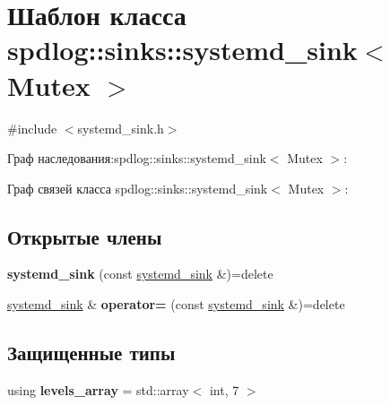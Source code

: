 \hypertarget{classspdlog_1_1sinks_1_1systemd__sink}{}\section{Шаблон класса spdlog\+:\+:sinks\+:\+:systemd\+\_\+sink$<$ Mutex $>$}
\label{classspdlog_1_1sinks_1_1systemd__sink}


{\ttfamily \#include $<$systemd\+\_\+sink.\+h$>$}



Граф наследования\+:spdlog\+:\+:sinks\+:\+:systemd\+\_\+sink$<$ Mutex $>$\+:


Граф связей класса spdlog\+:\+:sinks\+:\+:systemd\+\_\+sink$<$ Mutex $>$\+:
\subsection*{Открытые члены}
\begin{DoxyCompactItemize}
\item 
\mbox{\label{classspdlog_1_1sinks_1_1systemd__sink_ad7b63a446a6888241ab14c81e177288f}} 
{\bfseries systemd\+\_\+sink} (const \hyperlink{classspdlog_1_1sinks_1_1systemd__sink}{systemd\+\_\+sink} \&)=delete
\item 
\mbox{\label{classspdlog_1_1sinks_1_1systemd__sink_a1c2db92cf34a45775d26dfe0ad65c4ec}} 
\hyperlink{classspdlog_1_1sinks_1_1systemd__sink}{systemd\+\_\+sink} \& {\bfseries operator=} (const \hyperlink{classspdlog_1_1sinks_1_1systemd__sink}{systemd\+\_\+sink} \&)=delete
\end{DoxyCompactItemize}
\subsection*{Защищенные типы}
\begin{DoxyCompactItemize}
\item 
\mbox{\label{classspdlog_1_1sinks_1_1systemd__sink_ad0652008be66ac583f91e738c3d5a1f3}} 
using {\bfseries levels\+\_\+array} = std\+::array$<$ int, 7 $>$
\end{DoxyCompactItemize}
